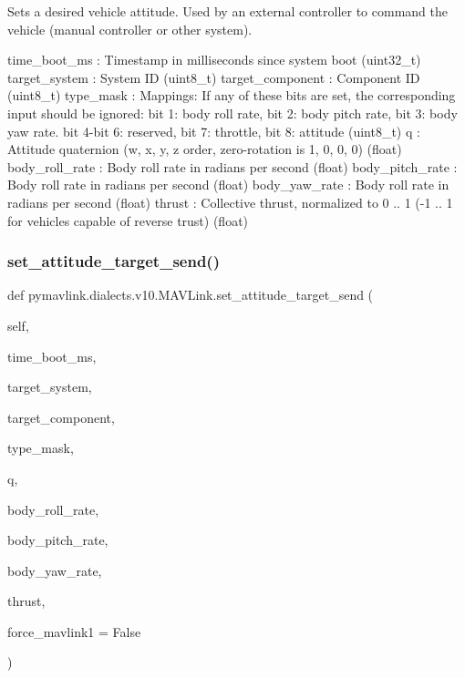 \begin{DoxyVerb}
\begin{DoxyVerb}
\begin{DoxyVerb}
\begin{DoxyVerb}
\begin{DoxyVerb}
\begin{DoxyVerb}
\begin{DoxyVerb}
\begin{DoxyVerb}
\begin{DoxyVerb}
\begin{DoxyVerb}
\begin{DoxyVerb}Sets a desired vehicle attitude. Used by an external controller to
command the vehicle (manual controller or other
system).

time_boot_ms              : Timestamp in milliseconds since system boot (uint32_t)
target_system             : System ID (uint8_t)
target_component          : Component ID (uint8_t)
type_mask                 : Mappings: If any of these bits are set, the corresponding input should be ignored: bit 1: body roll rate, bit 2: body pitch rate, bit 3: body yaw rate. bit 4-bit 6: reserved, bit 7: throttle, bit 8: attitude (uint8_t)
q                         : Attitude quaternion (w, x, y, z order, zero-rotation is 1, 0, 0, 0) (float)
body_roll_rate            : Body roll rate in radians per second (float)
body_pitch_rate           : Body roll rate in radians per second (float)
body_yaw_rate             : Body roll rate in radians per second (float)
thrust                    : Collective thrust, normalized to 0 .. 1 (-1 .. 1 for vehicles capable of reverse trust) (float)\end{DoxyVerb}
 \mbox{\label{classpymavlink_1_1dialects_1_1v10_1_1MAVLink_a37f9af7c6b9ed18ae0a9aa64b8d7cc14}} 
\subsubsection{\texorpdfstring{set\+\_\+attitude\+\_\+target\+\_\+send()}{set\_attitude\_target\_send()}}
{\footnotesize\ttfamily def pymavlink.\+dialects.\+v10.\+M\+A\+V\+Link.\+set\+\_\+attitude\+\_\+target\+\_\+send (\begin{DoxyParamCaption}\item[{}]{self,  }\item[{}]{time\+\_\+boot\+\_\+ms,  }\item[{}]{target\+\_\+system,  }\item[{}]{target\+\_\+component,  }\item[{}]{type\+\_\+mask,  }\item[{}]{q,  }\item[{}]{body\+\_\+roll\+\_\+rate,  }\item[{}]{body\+\_\+pitch\+\_\+rate,  }\item[{}]{body\+\_\+yaw\+\_\+rate,  }\item[{}]{thrust,  }\item[{}]{force\+\_\+mavlink1 = {\ttfamily False} }\end{DoxyParamCaption})}


\end{DoxyVerb}
\end{DoxyVerb}
\end{DoxyVerb}
\end{DoxyVerb}
\end{DoxyVerb}
\end{DoxyVerb}
\end{DoxyVerb}
\end{DoxyVerb}
\end{DoxyVerb}
\end{DoxyVerb}

